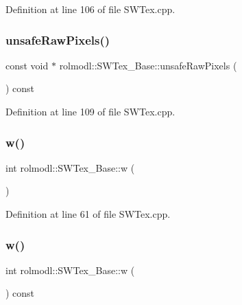 Definition at line 106 of file S\+W\+Tex.\+cpp.

\mbox{\label{classrolmodl_1_1_s_w_tex___base_a9f82650e1aa4d57a7537f07d1ba03692}} 
\subsubsection{\texorpdfstring{unsafeRawPixels()}{unsafeRawPixels()}\hspace{0.1cm}{\footnotesize\ttfamily [2/2]}}
{\footnotesize\ttfamily const void $\ast$ rolmodl\+::\+S\+W\+Tex\+\_\+\+Base\+::unsafe\+Raw\+Pixels (\begin{DoxyParamCaption}{ }\end{DoxyParamCaption}) const\hspace{0.3cm}{\ttfamily [noexcept]}}



Definition at line 109 of file S\+W\+Tex.\+cpp.

\mbox{\label{classrolmodl_1_1_s_w_tex___base_ad38dfbf23e9df3be982bccadb6fd35c4}} 
\subsubsection{\texorpdfstring{w()}{w()}\hspace{0.1cm}{\footnotesize\ttfamily [1/2]}}
{\footnotesize\ttfamily int rolmodl\+::\+S\+W\+Tex\+\_\+\+Base\+::w (\begin{DoxyParamCaption}{ }\end{DoxyParamCaption})\hspace{0.3cm}{\ttfamily [noexcept]}}



Definition at line 61 of file S\+W\+Tex.\+cpp.

\mbox{\label{classrolmodl_1_1_s_w_tex___base_adecbad428b1e1c911299f5af3c5d4593}} 
\subsubsection{\texorpdfstring{w()}{w()}\hspace{0.1cm}{\footnotesize\ttfamily [2/2]}}
{\footnotesize\ttfamily int rolmodl\+::\+S\+W\+Tex\+\_\+\+Base\+::w (\begin{DoxyParamCaption}{ }\end{DoxyParamCaption}) const\hspace{0.3cm}{\ttfamily [noexcept]}}



